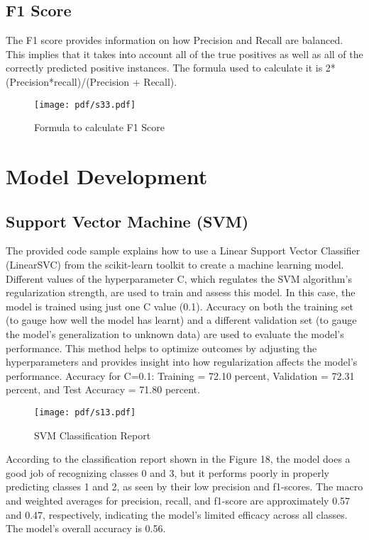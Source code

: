 \subsection {F1 Score}
The F1 score provides information on how Precision and Recall are balanced. This implies that it takes into account all of the true positives as well as all of the correctly predicted positive instances. The formula used to calculate it is 2*(Precision*recall)/(Precision + Recall).

\begin{figure}[ht!]
  \raggedright
  \texttt{[image: pdf/s33.pdf]}
  \vspace{-10pt}
  \caption{\textbf{ }Formula to calculate F1 Score}
\end{figure}

\section{Model Development} 
\subsection {Support Vector Machine (SVM)}
The provided code sample explains how to use a Linear Support Vector Classifier (LinearSVC) from the scikit-learn toolkit to create a machine learning model. Different values of the hyperparameter C, which regulates the SVM algorithm's regularization strength, are used to train and assess this model. In this case, the model is trained using just one C value (0.1). Accuracy on both the training set (to gauge how well the model has learnt) and a different validation set (to gauge the model's generalization to unknown data) are used to evaluate the model's performance.  This method helps to optimize outcomes by adjusting the hyperparameters and provides insight into how regularization affects the model's performance. Accuracy for C=0.1: Training = 72.10 percent, Validation = 72.31 percent, and Test Accuracy = 71.80 percent.

\begin{figure}[ht!]
  \raggedright
  \texttt{[image: pdf/s13.pdf]}
  \vspace{0pt}
  \caption{\textbf{ }SVM Classification Report}
\end{figure}
According to the classification report shown in the Figure 18, the model does a good job of recognizing classes 0 and 3, but it performs poorly in properly predicting classes 1 and 2, as seen by their low precision and f1-scores. The macro and weighted averages for precision, recall, and f1-score are approximately 0.57 and 0.47, respectively, indicating the model's limited efficacy across all classes. The model's overall accuracy is 0.56.


